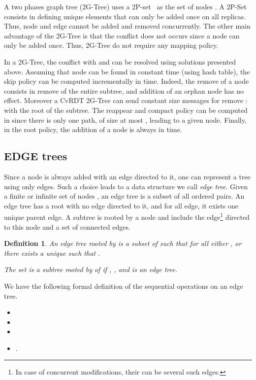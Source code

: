 \documentclass[a4paper]{article}
\newtheorem{definition}{Definition}
\begin{document}
A two phases graph tree (2G-Tree) uses a
2P-set~\cite{shapiro11comprehensive} as the set of nodes . A 2P-Set
consists in defining unique elements that can only be added once on
all replicas.  Thus, node and edge cannot be added and removed
concurrently.  The other main advantage of the 2G-Tree is that the
conflict  does not occurs since a node can only be added
once. Thus, 2G-Tree do not require any mapping policy.

In a 2G-Tree, the conflict  with  and  can be resolved using solutions presented above. Assuming
that node can be found in constant time (using hash table), the skip
policy can be computed incrementally in  time. Indeed, the
remove of a node consists in remove of the entire subtree, and
addition of an orphan node has no effect. Moreover a CvRDT 2G-Tree can
send constant size messages for remove :  with  the root of
the subtree.  The reappear and compact policy can be computed in
 since there is only one path, of size at most ,
leading to a given node. Finally, in the root policy, the addition of
a node is always in  time.


\subsection{EDGE trees}

Since a node is always added with an edge directed to it, one can
represent a tree using only edges. Such a choice leads to a data
structure we call {\em edge tree}. Given a finite or infinite set of
nodes , an edge tree is a subset of all ordered pairs. An edge tree
has a root with no edge directed to it, and for all edge, it exists one
unique parent edge. A subtree is rooted by a node and include the
edge\footnote{In case of concurrent modifications, their can be
  several such edges.} directed to this node and a set of connected
edges.


\begin{definition}
  An {\em edge tree}  rooted by  is a subset of 
  such that for all  either , or there exists a
  unique  such that .

  The set  is a {\em subtree} rooted by  of  if , ,  and  is an edge tree.
\end{definition}

We have the following formal definition of the sequential operations
on an edge tree.
\begin{itemize}
\item 
\item 
\item    
\item .
\end{itemize}
\end{document}

